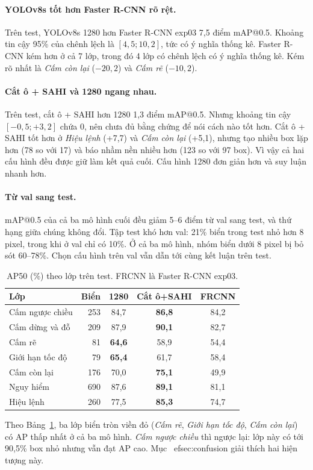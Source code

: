 \paragraph{YOLOv8s tốt hơn Faster R-CNN rõ rệt.}
Trên test, YOLOv8s 1280 hơn Faster R-CNN exp03 7,5 điểm mAP@0.5. Khoảng tin cậy 95\% của chênh lệch là $[4{,}5; 10{,}2]$, tức có ý nghĩa thống kê.
Faster R-CNN kém hơn ở cả 7 lớp, trong đó 4 lớp có chênh lệch có ý nghĩa thống kê. Kém rõ nhất là \textit{Cấm còn lại} ($-20{,}2$) và \textit{Cấm rẽ} ($-10{,}2$).

\paragraph{Cắt ô + SAHI và 1280 ngang nhau.}
Trên test, cắt ô + SAHI hơn 1280 1,3 điểm mAP@0.5. Nhưng khoảng tin cậy $[-0{,}5; +3{,}2]$ chứa 0, nên chưa đủ bằng chứng để nói cách nào tốt hơn.
Cắt ô + SAHI tốt hơn ở \textit{Hiệu lệnh} (+7,7) và \textit{Cấm còn lại} (+5,1), nhưng tạo nhiều box lặp hơn (78 so với 17) và báo nhầm nền nhiều hơn (123 so với 97 box).
Vì vậy cả hai cấu hình đều được giữ làm kết quả cuối. Cấu hình 1280 đơn giản hơn và suy luận nhanh hơn.

\paragraph{Từ val sang test.}
mAP@0.5 của cả ba mô hình cuối đều giảm 5--6 điểm từ val sang test, và thứ hạng giữa chúng không đổi.
Tập test khó hơn val: 21\% biển trong test nhỏ hơn 8 pixel, trong khi ở val chỉ có 10\%. Ở cả ba mô hình, nhóm biển dưới 8 pixel bị bỏ sót 60--78\%.
Chọn cấu hình trên val vẫn dẫn tới cùng kết luận trên test.

\begin{table}[t]
\centering
\small
\begin{tabular}{lrccc}
\toprule
Lớp & Biển & 1280 & Cắt ô+SAHI & FRCNN \\
\midrule
Cấm ngược chiều & 253 & 84,7 & \textbf{86,8} & 84,2 \\
Cấm dừng và đỗ  & 209 & 87,9 & \textbf{90,1} & 82,7 \\
Cấm rẽ          &  81 & \textbf{64,6} & 58,9 & 54,4 \\
Giới hạn tốc độ &  79 & \textbf{65,4} & 61,7 & 58,4 \\
Cấm còn lại     & 176 & 70,0 & \textbf{75,1} & 49,9 \\
Nguy hiểm       & 690 & 87,6 & \textbf{89,1} & 81,1 \\
Hiệu lệnh       & 260 & 77,5 & \textbf{85,3} & 74,7 \\
\bottomrule
\end{tabular}
\caption{AP50 (\%) theo lớp trên test. FRCNN là Faster R-CNN exp03.}
\label{tab:per-class-test}
\end{table}

Theo Bảng~\ref{tab:per-class-test}, ba lớp biển tròn viền đỏ (\textit{Cấm rẽ}, \textit{Giới hạn tốc độ}, \textit{Cấm còn lại}) có AP thấp nhất ở cả ba mô hình. \textit{Cấm ngược chiều} thì ngược lại: lớp này có tới 90,5\% box nhỏ nhưng vẫn đạt AP cao. Mục~
ef{sec:confusion} giải thích hai hiện tượng này.
